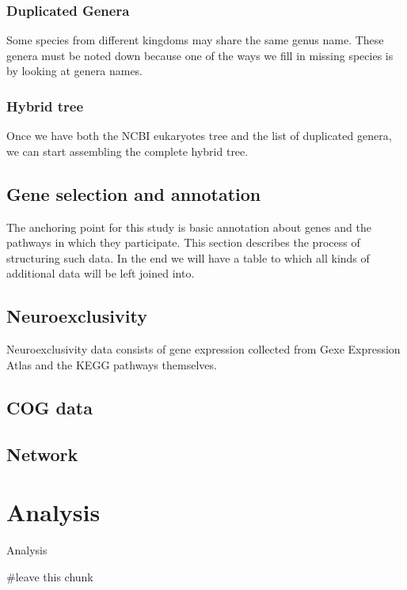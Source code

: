 \documentclass[
]{article}
\newenvironment{Shaded}{\begin{snugshade}}{\end{snugshade}}
\newcommand{\CommentTok}[1]{\textcolor[rgb]{0.50,0.62,0.50}{#1}}
\let\oldShaded\Shaded
\let\endoldShaded\endShaded
\renewenvironment{Shaded}{\scriptsize\oldShaded}{\endoldShaded}
\begin{document}
\hypertarget{duplicated-genera}{%
\subsubsection{Duplicated Genera}\label{duplicated-genera}}

Some species from different kingdoms may share the same genus name.
These genera must be noted down because one of the ways we fill in
missing species is by looking at genera names.


\hypertarget{hybrid-tree}{%
\subsubsection{Hybrid tree}\label{hybrid-tree}}

Once we have both the NCBI eukaryotes tree and the list of duplicated
genera, we can start assembling the complete hybrid tree.


\hypertarget{gene-selection-and-annotation}{%
\subsection{Gene selection and
annotation}\label{gene-selection-and-annotation}}

The anchoring point for this study is basic annotation about genes and
the pathways in which they participate. This section describes the
process of structuring such data. In the end we will have a table to
which all kinds of additional data will be left joined into.


\hypertarget{neuroexclusivity}{%
\subsection{Neuroexclusivity}\label{neuroexclusivity}}

Neuroexclusivity data consists of gene expression collected from Gexe
Expression Atlas and the KEGG pathways themselves.


\hypertarget{cog-data}{%
\subsection{COG data}\label{cog-data}}

\hypertarget{network}{%
\subsection{Network}\label{network}}

\hypertarget{analysis}{%
\section{Analysis}\label{analysis}}

Analysis

\begin{Shaded}
\begin{Highlighting}[]
\CommentTok{#leave this chunk}
\end{Highlighting}
\end{Shaded}
\end{document}

